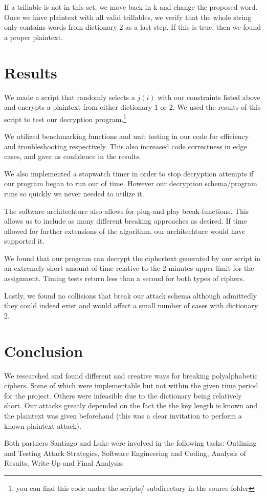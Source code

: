 \documentclass[pdftex,12pt,letter]{article}
\begin{document}
If a trillable is not in this set, we move back in k and change the proposed
word. Once we have plaintext with all valid trillables, we verify that the whole
string only contains words from dictionary 2 as a last step. If this is
true, then we found a proper plaintext.


\section{Results}

We made a script that randomly selects a $j(i)$ with our constraints listed
above and encrypts a plaintext from either dictionary 1 or 2. We used the
results of this script to test our decryption program.\footnote{you can find
 this code under the scripts/ subdirectory in the source folder}

We utilized benchmarking functions and unit testing in our code for efficiency
and troubleshooting respectively. This also increased code correctness in edge
cases, and gave us confidence in the results.

We also implemented a stopwatch timer in order to stop decryption attempts if
our program began to run our of time. However our decryption schema/program
runs so quickly we never needed to utilize it. 

The software architechture also allows for plug-and-play break-functions. This
allows us to include as many different breaking approaches as desired. If time
allowed for further extensions of the algorithm, our architechture would have
supported it.

We found that our program can decrypt the ciphertext generated by our script in
an extremely short amount of time relative to the 2 minutes upper limit for the
assignment. Timing tests return less than a second for both types of ciphers.

Lastly, we found no collisions that break our attack schema although admittedly
they could indeed exist and would affect a small number of cases with
dictionary 2. 
 
\section{Conclusion}

We researched and found different and creative ways for breaking polyalphabetic
ciphers.  Some of which were implementable but not within the given time period
for the project.  Others were infeasible due to the dictionary being relatively
short. Our attacks greatly depended on the fact the the key length is known and
the plaintext was given beforehand (this was a clear invitation to perform a
known plaintext attack).

Both partners Santiago and Luke were involved in the following tasks: Outlining
and Testing  Attack Strategies, Software Engineering and Coding, Analysis of
Results, Write-Up and Final Analysis.
\end{document}
